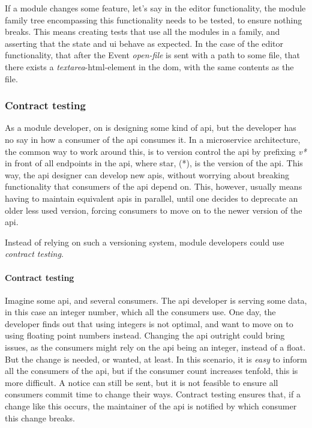 If a module changes some feature, let's say in the editor functionality, the
module family tree encompassing this functionality needs to be tested, to ensure
nothing breaks. This means creating tests that use all the modules in a family,
and asserting that the state and \gls*{ui} behave as expected. In the case of
the editor functionality, that after the Event \textit{open-file} is sent with
a path to some file, that there exists a \textit{textarea}-\gls*{html}-element in
the \gls*{dom}, with the same contents as the file.

\subsubsection{Contract testing}

As a module developer, on is designing some kind of \gls*{api}, but the developer
has no say in how a consumer of the \gls*{api} consumes it. In a microservice
architecture, the common way to work around this, is to version control the
\gls*{api} by prefixing \textit{v*} in front of all endpoints in the \gls*{api},
where star, (*), is the version of the \gls*{api}. This way, the \gls*{api}
designer can develop new \gls*{api}s, without worrying about breaking
functionality that consumers of the \gls*{api} depend on. This, however, usually
means having to maintain equivalent \gls*{api}s in parallel, until one decides
to deprecate an older less used version, forcing consumers to move on to the
newer version of the \gls*{api}.

Instead of relying on such a versioning system, module developers could use
\textit{contract testing}.

\paragraph{Contract testing} Imagine some \gls*{api}, and several consumers.
The \gls*{api} developer is serving some data, in this case an integer number,
which all the consumers use. One day, the developer finds out that using
integers is not optimal, and want to move on to using floating point numbers
instead. Changing the \gls*{api} outright could bring issues, as the consumers
might rely on the \gls*{api} being an integer, instead of a float. But the
change is needed, or wanted, at least. In this scenario, it is \textit{easy} to
inform all the consumers of the \gls*{api}, but if the consumer count increases
tenfold, this is more difficult. A notice can still be sent, but it is not
feasible to ensure all consumers commit time to change their ways. Contract
testing ensures that, if a change like this occurs, the maintainer of the
\gls*{api} is notified by which consumer this change breaks.

